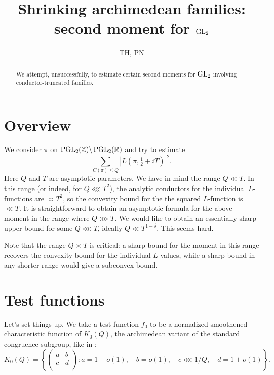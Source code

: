 \documentclass[reqno]{amsart} 
\title{Shrinking archimedean families: second moment for $\operatorname{GL}_2$}
\author{TH, PN}
\begin{document}
\maketitle
\tableofcontents

\begin{abstract}
  We attempt, unsuccessfully, to estimate certain second moments for $\operatorname{GL}_2$ involving conductor-truncated families.
\end{abstract}

\section{Overview}\label{sec:20230522180023}
We consider $\pi $ on $\operatorname{PGL}_2(\mathbb{Z}) \backslash \operatorname{PGL}_2(\mathbb{R})$ and try to estimate
\begin{equation*}
\sum_{C(\pi) \leq Q} \left\lvert L (\pi, \tfrac{1}{2} + i T ) \right\rvert^2.
\end{equation*}
Here $Q$ and $T$ are asymptotic parameters.  We have in mind the range $Q \ll T$.  In this range (or indeed, for $Q \lll T^2$), the analytic conductors for the individual $L$-functions are $\asymp T^2$, so the convexity bound for the the squared $L$-function is $\ll T$.  It is straightforward to obtain an asymptotic formula for the above moment in the range where $Q \ggg T$.  We would like to obtain an essentially sharp upper bound for some $Q \lll T$, ideally $Q \ll T^{1-\delta}$.  This seems hard.

Note that the range $Q \asymp T$ is critical: a sharp bound for the moment in this range recovers the convexity bound for the individual $L$-values, while a sharp bound in any shorter range would give a subconvex bound.

\section{Test functions}\label{sec:20230522180025}
Let's set things up.  We take a test function $f_0$ to be a normalized smoothened characteristic function of $K_0(Q)$, the archimedean variant of the standard congruence subgroup, like in \cite{JN19a}:
\begin{equation*}
  K_0(Q)
  = \left\{
    \begin{pmatrix}
a & b \\
c & d \\
    \end{pmatrix}
    :
    a = 1 + o(1), \quad
    b = o(1),
    \quad
    c \lll 1/Q,
    \quad
    d = 1 + o(1)
  \right\}.
\end{equation*}
\end{document}
